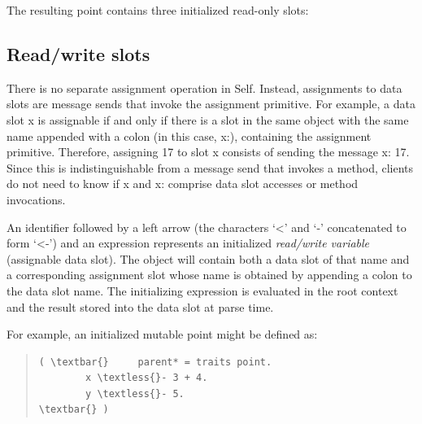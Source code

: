 \documentclass[letterpaper,10pt,english]{sphinxmanual}
\begin{document}
The resulting point contains three initialized read-only slots:
\begin{figure}[htbp]\begin{flushleft}

\end{flushleft}\end{figure}


\subsection{Read/write slots}
\label{langref:read-write-slots}\label{langref:index-37}
There is no separate assignment operation in Self. Instead, assignments to data slots are message sends that invoke the assignment primitive. For example, a data slot x is assignable if and only if there is a slot in the same object with the same name appended with a colon (in this case, x:), containing the assignment primitive. Therefore, assigning 17 to slot x consists of sending the message x: 17. Since this is indistinguishable from a message send that invokes a method, clients do not need to know if x and x: comprise data slot accesses or method invocations.

An identifier followed by a left arrow (the characters ‘\textless{}’ and ‘-’ concatenated to form ‘\textless{}-’) and an expression represents an initialized \emph{read/write variable} (assignable data slot). The object will contain both a data slot of that name and a corresponding assignment slot whose name is obtained by appending a colon to the data slot name. The initializing expression is evaluated in the root context and the result stored into the data slot at parse time.

For example, an initialized mutable point might be defined as:
\begin{quote}

\begin{Verbatim}[commandchars=\\\{\}]
( \textbar{}     parent* = traits point.
        x \textless{}- 3 + 4.
        y \textless{}- 5.
\textbar{} )
\end{Verbatim}
\end{quote}
\end{document}

